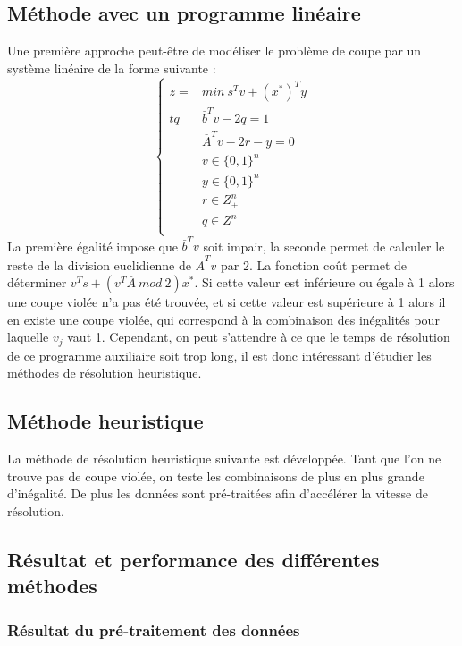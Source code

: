\documentclass[12pt]{report}
\begin{document}
\subsection{Méthode avec un programme linéaire}
Une première approche peut-être de modéliser le problème de coupe par un système linéaire de la forme suivante :
$$
\left\{
    \begin{array}{ll}
        z=&min \ s^Tv+(x^\ast)^Ty \\
        tq &  \overset{\_}{b}^Tv-2q=1 \\
          & \overset{\_}{A}^Tv-2r-y=0 \\
          & v \in \{0,1\}^n \\
          & y \in \{0,1\}^n \\
          & r \in Z^n_+ \\
          & q \in Z^n \\
    \end{array}
\right.
$$
La première égalité impose que $\overset{\_}{b}^Tv$ soit impair, la seconde permet de calculer le reste de la division euclidienne de $\overset{\_}{A}^Tv$ par 2. La fonction coût permet de déterminer $v^Ts+(v^T\overset{\_}{A}\ mod\ 2)x^\ast$. Si cette valeur est inférieure ou égale à 1 alors une coupe violée n'a pas été trouvée, et si cette valeur est supérieure à 1 alors il en existe une coupe violée, qui correspond à la combinaison des inégalités pour laquelle $v_j$ vaut 1.
Cependant, on peut s'attendre à ce que le temps de résolution de ce programme auxiliaire soit trop long, il est donc intéressant d'étudier les méthodes de résolution heuristique.

\subsection{Méthode heuristique}
La méthode de résolution heuristique suivante est développée. Tant que l'on ne trouve pas de coupe violée, on teste les combinaisons de plus en plus grande d'inégalité.
De plus les données sont pré-traitées afin d'accélérer la vitesse de résolution.

\subsection{Résultat et performance des différentes méthodes}

\subsubsection{Résultat du pré-traitement des données}
\end{document}
